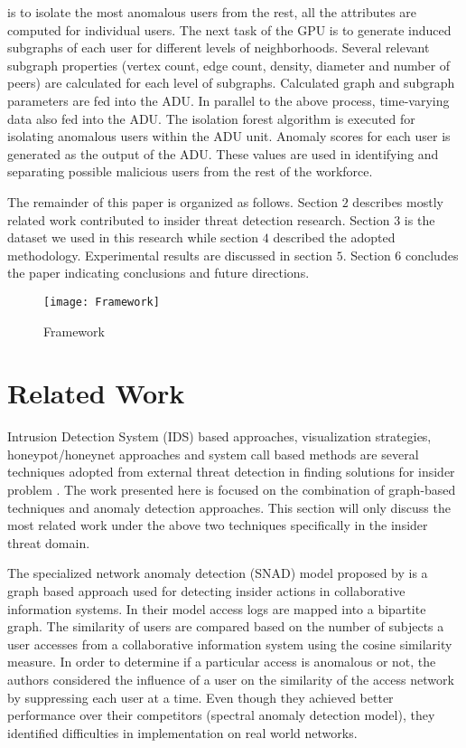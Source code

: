 \documentclass[conference,draftclsnofoot,onecolumn]{IEEEtran}%
\begin{document}
is to isolate the most anomalous users from the rest, all the attributes are computed for individual users. The next task of the GPU is to generate induced subgraphs of each user for different levels of neighborhoods. Several relevant subgraph properties (vertex count, edge count, density, diameter and number of peers) are calculated for each level of subgraphs. Calculated graph and subgraph parameters are fed into the ADU. In parallel to the above process, time-varying data also fed into the ADU. The isolation forest algorithm is executed for isolating anomalous users within the ADU unit. Anomaly scores for each user is generated as the output of the ADU. These values are used in identifying and separating possible malicious users from the rest of the workforce.       

The remainder of this paper is organized  as follows. Section $2$ describes mostly related work contributed to insider threat detection research. Section $3$ is the dataset we used in this research while section $4$ described the adopted methodology. Experimental results are discussed in section $5$. Section $6$ concludes the paper indicating conclusions and future directions.

\begin{figure}[h]
\centering
\texttt{[image: Framework]}
\caption{Framework}
\label{figure 1}
\vspace{-10pt}
\end{figure}

\section{Related Work}
Intrusion Detection System (IDS) based approaches, visualization strategies, honeypot/honeynet approaches and system call based methods are several techniques adopted from external threat detection in finding solutions for insider problem \cite{Zeadally2012}. The work presented here is focused on the combination of graph-based techniques and anomaly detection approaches. This section will only discuss the most related work under the above two techniques specifically in the insider threat domain.

The specialized network anomaly detection (SNAD) model proposed by \cite{Chen2012} is a graph based approach used for detecting insider actions in collaborative information systems. In their model access logs are mapped into a bipartite graph. The similarity of users are compared based on the number of subjects a user accesses from a collaborative information system using the cosine similarity measure. In order to determine if a particular access is anomalous or not, the authors considered the influence of a user on the similarity of the access network by suppressing each user at a time. Even though they achieved better performance over their competitors (spectral anomaly detection model), they identified difficulties in implementation on real world networks.
\end{document}
